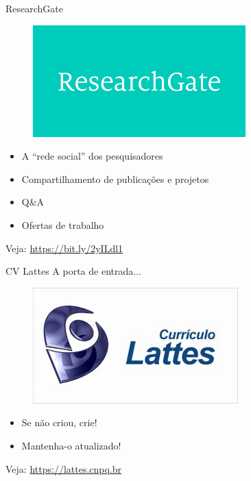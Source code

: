 \begin{frame}{ResearchGate}
\begin{figure}
\centering
\includegraphics[scale=0.4]{figs/02/rg}
\end{figure}
\begin{itemize}
\item A ``rede social'' dos pesquisadores
\item Compartilhamento de publicações e projetos
\item Q{\&}A
\item Ofertas de trabalho
\end{itemize}

\scriptsize{Veja: \url{https://bit.ly/2yILdl1}}
\end{frame}

\begin{frame}{CV Lattes}
A porta de entrada...

\begin{figure}
\centering
\includegraphics[scale=0.4]{figs/02/cvlattes}
\end{figure}
\begin{itemize}
\item Se não criou, crie!
\item Mantenha-o atualizado!
\end{itemize}

Veja: \url{https://lattes.cnpq.br}
\end{frame}

